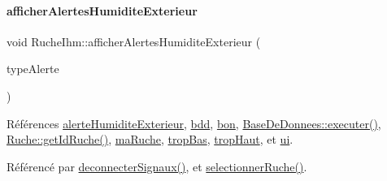 \paragraph{\texorpdfstring{afficher\+Alertes\+Humidite\+Exterieur}{afficherAlertesHumiditeExterieur}}
{\footnotesize\ttfamily void Ruche\+Ihm\+::afficher\+Alertes\+Humidite\+Exterieur (\begin{DoxyParamCaption}\item[{\hyperlink{parametres_8h_aaa6de8207c94675264c90b10b613368d}{Seuils\+Alertes}}]{type\+Alerte }\end{DoxyParamCaption})\hspace{0.3cm}{\ttfamily [slot]}}



Références \hyperlink{parametres_8h_a83a725fd153179a2bd97afcc8307737bacda66fabe33c8c197f8ff098a952fca3}{alerte\+Humidite\+Exterieur}, \hyperlink{class_ruche_ihm_a0851936fe212e8d40538264f09749153}{bdd}, \hyperlink{parametres_8h_aaa6de8207c94675264c90b10b613368da5ac8ec3b54d90a07c6bb5a77ef971821}{bon}, \hyperlink{class_base_de_donnees_aa8de5f8f8bb17edc43f5c0ee33712081}{Base\+De\+Donnees\+::executer()}, \hyperlink{class_ruche_a9f2de5ef29557ec7a53d5e22df34d164}{Ruche\+::get\+Id\+Ruche()}, \hyperlink{class_ruche_ihm_a43a6b1fa31f4fba58d919daae3707b38}{ma\+Ruche}, \hyperlink{parametres_8h_aaa6de8207c94675264c90b10b613368da4257e2f8921856770c8266f55c937295}{trop\+Bas}, \hyperlink{parametres_8h_aaa6de8207c94675264c90b10b613368dabc650d9700ae19f2696e6a6e3f9ab067}{trop\+Haut}, et \hyperlink{class_ruche_ihm_a64786058bd7f88ca2f1e9743bb27c25b}{ui}.



Référencé par \hyperlink{class_ruche_ihm_a348a76106f3072dd31a382c6025b8113}{deconnecter\+Signaux()}, et \hyperlink{class_ruche_ihm_a7324ae6ea574ccdad47783f466933157}{selectionner\+Ruche()}.


